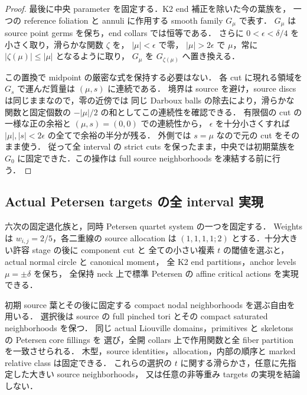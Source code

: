 \begin{proof}
最後に中央 parameter を固定する．K2 end 補正を除いた今の葉族を，
一つの reference foliation と annuli に作用する smooth family $G_\mu$ で表す．
$G_\mu$ は source point germs を保ち，end collars では恒等である．
さらに $0<\epsilon<\delta/4$ を小さく取り，滑らかな関数 $\zeta$ を，
$|\mu|<\epsilon$ で零，
$|\mu|>2\epsilon$ で $\mu$，常に $|\zeta(\mu)|\le|\mu|$ となるように取り，
$G_\mu$ を $G_{\zeta(\mu)}$ へ置き換える．

この置換で midpoint の厳密な式を保持する必要はない．
各 cut に現れる領域を $G_s$ で運んだ質量は $(\mu,s)$ に連続である．
境界は source を避け，source discs は同じままなので，零の近傍では
同じ Darboux balls の除去により，滑らかな関数と固定個数の $-|\mu|/2$
の和としてこの連続性を確認できる．
有限個の cut の一様な正の余裕と $(\mu,s)=(0,0)$ での連続性から，
$\epsilon$ を十分小さくすれば $|\mu|,|s|<2\epsilon$ の全てで余裕の半分が残る．
外側では $s=\mu$ なので元の cut をそのまま使う．
従って全 interval の strict cuts を保ったまま，中央では初期葉族を
$G_0$ に固定できた．この操作は full source neighborhoods を凍結する前に行う．
\end{proof}

\subsection{Actual Petersen targets の全 interval 実現}

\begin{theorem}
\label{ke:petersen-full-moment}
六次の固定退化族と，同時 Petersen quartet system の一つを固定する．
Weights は $w_{i,j}=2/5$，各二重線の source allocation は
$(1,1,1,1;2)$ とする．十分大きい許容 stage の後に component cut と
全ての小さい複素 $t$ の閾値を選ぶと，actual normal circle と canonical moment，
全 K2 end partitions，anchor levels $\mu=\pm\delta$ を保ち，
全保持 neck 上で標準 Petersen の affine critical actions を実現できる．

初期 source 葉とその後に固定する compact nodal neighborhoods を選ぶ自由を用いる．
選択後は source の full pinched tori とその compact saturated neighborhoods を保つ．
同じ actual Liouville domains，primitives と skeletons の Petersen core fillings を
選び，全開 collars 上で作用関数と全 fiber partition を一致させられる．
木型，source identities，allocation，内部の順序と marked relative class は固定できる．
これらの選択の $t$ に関する滑らかさ，任意に先指定した大きい source neighborhoods，
又は任意の非等重み targets の実現を結論しない．
\end{theorem}

